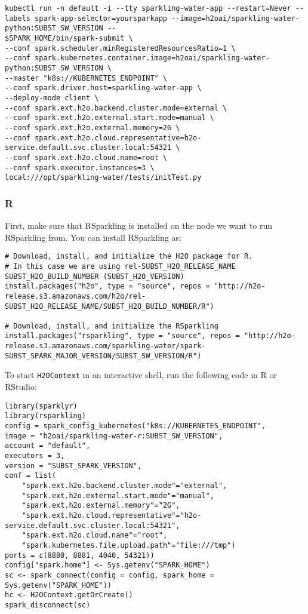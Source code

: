 \begin{lstlisting}[style=Bash]
kubectl run -n default -i --tty sparkling-water-app --restart=Never --labels spark-app-selector=yoursparkapp --image=h2oai/sparkling-water-python:SUBST_SW_VERSION --
$SPARK_HOME/bin/spark-submit \
--conf spark.scheduler.minRegisteredResourcesRatio=1 \
--conf spark.kubernetes.container.image=h2oai/sparkling-water-python:SUBST_SW_VERSION \
--master "k8s://KUBERNETES_ENDPOINT" \
--conf spark.driver.host=sparkling-water-app \
--deploy-mode client \
--conf spark.ext.h2o.backend.cluster.mode=external \
--conf spark.ext.h2o.external.start.mode=manual \
--conf spark.ext.h2o.external.memory=2G \
--conf spark.ext.h2o.cloud.representative=h2o-service.default.svc.cluster.local:54321 \
--conf spark.ext.h2o.cloud.name=root \
--conf spark.executor.instances=3 \
local:///opt/sparkling-water/tests/initTest.py
\end{lstlisting}

\subsubsection{R}

First, make sure that RSparkling is installed on the node we want to run RSparkling from.
You can install RSparkling as:

\begin{lstlisting}[style=R]
# Download, install, and initialize the H2O package for R.
# In this case we are using rel-SUBST_H2O_RELEASE_NAME SUBST_H2O_BUILD_NUMBER (SUBST_H2O_VERSION)
install.packages("h2o", type = "source", repos = "http://h2o-release.s3.amazonaws.com/h2o/rel-SUBST_H2O_RELEASE_NAME/SUBST_H2O_BUILD_NUMBER/R")

# Download, install, and initialize the RSparkling
install.packages("rsparkling", type = "source", repos = "http://h2o-release.s3.amazonaws.com/sparkling-water/spark-SUBST_SPARK_MAJOR_VERSION/SUBST_SW_VERSION/R")
\end{lstlisting}

To start \texttt{H2OContext} in an interactive shell, run the following code in R or RStudio:

\begin{lstlisting}[style=R]
library(sparklyr)
library(rsparkling)
config = spark_config_kubernetes("k8s://KUBERNETES_ENDPOINT",
image = "h2oai/sparkling-water-r:SUBST_SW_VERSION",
account = "default",
executors = 3,
version = "SUBST_SPARK_VERSION",
conf = list(
    "spark.ext.h2o.backend.cluster.mode"="external",
    "spark.ext.h2o.external.start.mode"="manual",
    "spark.ext.h2o.external.memory"="2G",
    "spark.ext.h2o.cloud.representative"="h2o-service.default.svc.cluster.local:54321",
    "spark.ext.h2o.cloud.name"="root",
    "spark.kubernetes.file.upload.path"="file:///tmp")
ports = c(8880, 8881, 4040, 54321))
config["spark.home"] <- Sys.getenv("SPARK_HOME")
sc <- spark_connect(config = config, spark_home = Sys.getenv("SPARK_HOME"))
hc <- H2OContext.getOrCreate()
spark_disconnect(sc)
\end{lstlisting}



